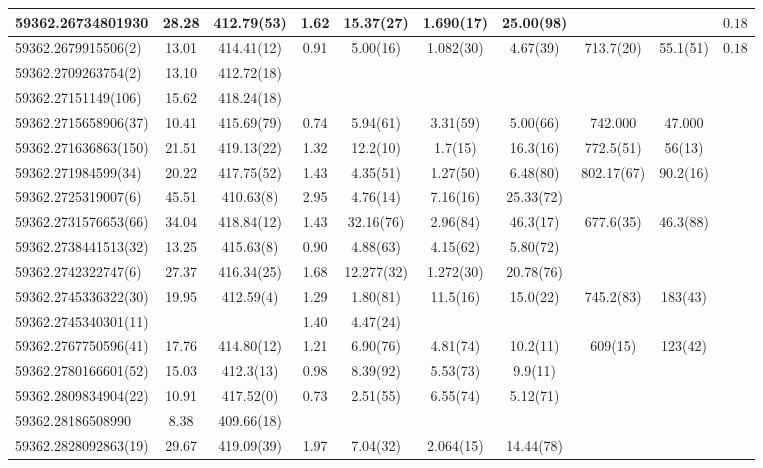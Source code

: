 {{\begin{longtable}{lccccccccc}
\hline
59362.26734801930 & 28.28 & 412.79(53) & 1.62 & 15.37(27) & 1.690(17)  & 25.00(98) &  &  & $0.18$ \\
\hline
59362.2679915506(2) & 13.01 & 414.41(12) & 0.91 & 5.00(16) & 1.082(30)  & 4.67(39) & 713.7(20) & 55.1(51) & $0.18$ \\
\hline
59362.2709263754(2) & 13.10 & 412.72(18) &  &    &  &  &  &  &  \\
\hline
59362.27151149(106) & 15.62 & 418.24(18) &  &    &  &  &  &  &  \\
\hline
59362.2715658906(37) & 10.41 & 415.69(79) & 0.74 & 5.94(61) & 3.31(59)  & 5.00(66) & 742.000 & 47.000 &  \\
\hline
59362.271636863(150) & 21.51 & 419.13(22) & 1.32 & 12.2(10) & 1.7(15)  & 16.3(16) & 772.5(51) & 56(13) &  \\
\hline
59362.271984599(34) & 20.22 & 417.75(52) & 1.43 & 4.35(51) & 1.27(50)  & 6.48(80) & 802.17(67) & 90.2(16) &  \\
\hline
59362.2725319007(6) & 45.51 & 410.63(8) & 2.95 & 4.76(14) & 7.16(16)  & 25.33(72) &  &  &  \\
\hline
59362.2731576653(66) & 34.04 & 418.84(12) & 1.43 & 32.16(76) & 2.96(84)  & 46.3(17) & 677.6(35) & 46.3(88) &  \\
\hline
59362.2738441513(32) & 13.25 & 415.63(8) & 0.90 & 4.88(63) & 4.15(62)  & 5.80(72) &  &  &  \\
\hline
59362.2742322747(6) & 27.37 & 416.34(25) & 1.68 & 12.277(32) & 1.272(30)  & 20.78(76) &  &  &  \\
\hline
59362.2745336322(30)  & 19.95 & 412.59(4) & 1.29 & 1.80(81) & 11.5(16)  & 15.0(22) & 745.2(83) & 183(43) &  \\
59362.2745340301(11)  &  &  & 1.40 & 4.47(24) &  &  &  &  &  \\
\hline
59362.2767750596(41) & 17.76 & 414.80(12) & 1.21 & 6.90(76) & 4.81(74)  & 10.2(11) & 609(15) & 123(42) &  \\
\hline
59362.2780166601(52) & 15.03 & 412.3(13) & 0.98 & 8.39(92) & 5.53(73)  & 9.9(11) &  &  &  \\
\hline
59362.2809834904(22) & 10.91 & 417.52(0) & 0.73 & 2.51(55) & 6.55(74)  & 5.12(71) &  &  &  \\
\hline
59362.28186508990 & 8.38 & 409.66(18) &  &  &  &  &  &   &  \\
\hline
59362.2828092863(19) & 29.67 & 419.09(39) & 1.97 & 7.04(32) & 2.064(15)  & 14.44(78) &  &  &  \\
\hline

\end{longtable}
}}

